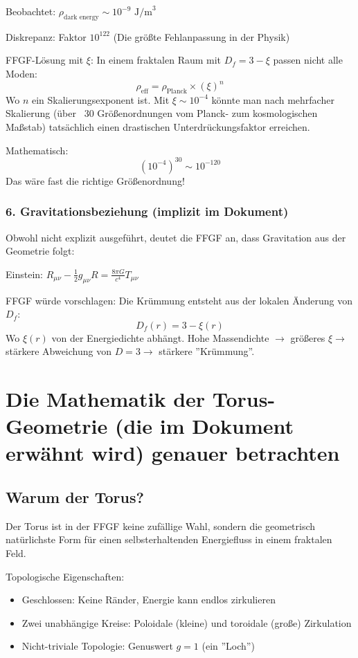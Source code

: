 	Beobachtet: \( \rho_{\text{dark energy}} \sim 10^{-9} \text{ J/m}^3 \)
	
	Diskrepanz: Faktor \( 10^{122} \) (Die größte Fehlanpassung in der Physik)
	
	FFGF-Lösung mit \( \xi \):
	In einem fraktalen Raum mit \( D_f = 3 - \xi \) passen nicht alle Moden:
	\[
	\rho_{\text{eff}} = \rho_{\text{Planck}} \times (\xi)^n
	\]
	Wo \( n \) ein Skalierungsexponent ist. Mit \( \xi \sim 10^{-4} \) könnte man nach mehrfacher Skalierung (über ~30 Größenordnungen vom Planck- zum kosmologischen Maßstab) tatsächlich einen drastischen Unterdrückungsfaktor erreichen.
	
	Mathematisch:
	\[
	(10^{-4})^{30} \sim 10^{-120}
	\]
	Das wäre fast die richtige Größenordnung!
	
	\subsubsection{6. Gravitationsbeziehung (implizit im Dokument)}
	Obwohl nicht explizit ausgeführt, deutet die FFGF an, dass Gravitation aus der Geometrie folgt:
	
	Einstein: \( R_{\mu\nu} - \frac{1}{2}g_{\mu\nu}R = \frac{8\pi G}{c^4} T_{\mu\nu} \)
	
	FFGF würde vorschlagen: Die Krümmung entsteht aus der lokalen Änderung von \( D_f \):
	\[
	D_f(r) = 3 - \xi(r)
	\]
	Wo \( \xi(r) \) von der Energiedichte abhängt. Hohe Massendichte \( \rightarrow \) größeres \( \xi \rightarrow \) stärkere Abweichung von \( D=3 \rightarrow \) stärkere ''Krümmung''.
	
	\section{Die Mathematik der Torus-Geometrie (die im Dokument erwähnt wird) genauer betrachten}
	\subsection{Warum der Torus?}
	Der Torus ist in der FFGF keine zufällige Wahl, sondern die geometrisch natürlichste Form für einen selbsterhaltenden Energiefluss in einem fraktalen Feld.
	
	Topologische Eigenschaften:
	\begin{itemize}
		\item Geschlossen: Keine Ränder, Energie kann endlos zirkulieren
		\item Zwei unabhängige Kreise: Poloidale (kleine) und toroidale (große) Zirkulation
		\item Nicht-triviale Topologie: Genuswert \( g = 1 \) (ein ''Loch'')
	\end{itemize}
	
